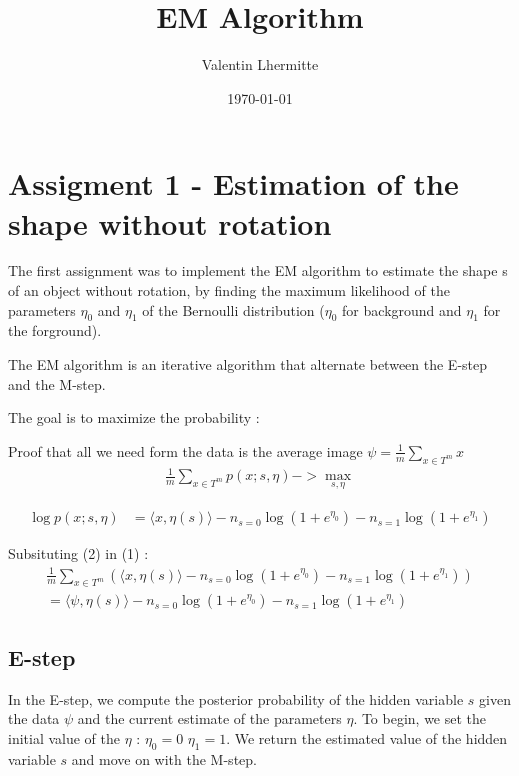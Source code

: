 \documentclass{article}
\begin{document}
\title{EM Algorithm}

\author{Valentin Lhermitte}
\date{\today}

\maketitle

\section{Assigment 1 - Estimation of the shape without rotation}

The first assignment was to implement the EM algorithm to estimate the shape s of an object without rotation, 
by finding the maximum likelihood of the parameters $\eta_0$ and $\eta_1$ of the Bernoulli distribution ($\eta_0$ for background and $\eta_1$ for the forground).

The EM algorithm is an iterative algorithm that alternate between the E-step and the M-step.

The goal is to maximize the probability : 

Proof that all we need form the data is the average image $\psi = \frac{1}{m} \sum_{x \in T^m} x$ 
\begin{align*}
    \frac{1}{m} \sum_{x \in T^m}p(x; s, \eta) -> \max_{s, \eta} \tag{1}
\end{align*}

\begin{align*}
    \log p(x; s, \eta) &= \langle x, \eta(s) \rangle - n_{s=0} \log(1 + e^{\eta_0}) - n_{s=1} \log(1 + e^{\eta_1}) \tag{2}
\end{align*}

Subsituting (2) in (1) :
\begin{align*}  
    \frac{1}{m} \sum_{x \in T^m}(\langle x, \eta(s) \rangle - n_{s=0} \log(1 + e^{\eta_0}) - n_{s=1} \log(1 + e^{\eta_1})) \\
    = \langle\psi, \eta(s)\rangle - n_{s=0} \log(1 + e^{\eta_0}) - n_{s=1} \log(1 + e^{\eta_1}) \tag{3}
\end{align*}

\subsection*{E-step}

In the E-step, we compute the posterior probability of the hidden variable $s$ given the data $\psi$ and the current estimate of the parameters $\eta$.
To begin, we set the initial value of the $\eta$ : $\eta_0 = 0$ $\eta_1 = 1$.
We return the estimated value of the hidden variable $s$ and move on with the M-step.
\end{document}
